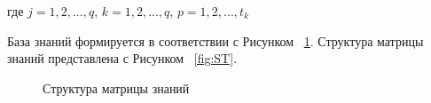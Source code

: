 где  $j = {1,2, ..., q}$, $k = {1,2, ..., q}$, $p = {1,2, ..., t_k}$

База знаний формируется в соответствии с Рисунком ~\cref{fig:KBase}. Структура матрицы знаний представлена с Рисунком ~\cref{fig:ST}.
\begin{figure}[ht]
    \caption{Структура матрицы знаний}\label{fig:KBase}
\end{figure}


